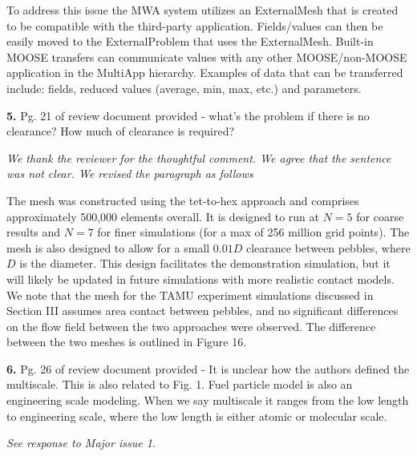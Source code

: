 \documentclass{nseJournal}
\begin{document}
 To address this issue the MWA system utilizes an ExternalMesh that is created to be compatible with the third-party application. Fields/values can then be easily moved to the ExternalProblem  that uses the ExternalMesh. Built-in MOOSE transfers can communicate values with any other MOOSE/non-MOOSE application in the MultiApp hierarchy.  Examples of data that can be transferred include: fields, reduced values (average, min, max, etc.) and parameters.

\textbf{5.} Pg. 21 of review document provided - what's the problem if there is no clearance? How much of clearance is required?

\textit{We thank the reviewer for the thoughtful comment. We agree that the sentence was not clear. We revised the paragraph as follows}

The mesh was constructed using the tet-to-hex approach and comprises approximately 500,000 elements overall. It is designed to run at $N=5$ for coarse results and $N=7$ for finer simulations (for a max of 256 million grid points). The mesh is also designed to allow for a small $0.01D$ clearance between pebbles, where $D$ is the diameter. This design facilitates the demonstration simulation, but it will likely be updated in future simulations with more realistic contact models. We note that the mesh for the TAMU experiment simulations discussed in Section III assumes area contact between pebbles, and no significant differences on the flow field between the two approaches were observed. The difference between the two meshes is outlined in Figure 16.

\textbf{6.} Pg. 26 of review document provided - It is unclear how the authors defined the multiscale. This is also related to Fig. 1. Fuel particle model is also an engineering scale modeling. When we
say multiscale it ranges from the low length to engineering scale, where the low length is either atomic or molecular scale.

\textit{See response to Major issue 1.}

%

%
%
%

%
\end{document}
